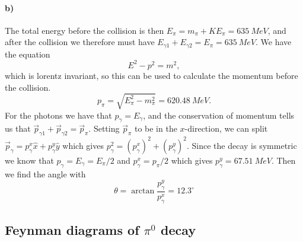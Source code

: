 \paragraph{b)} The total energy before the collision is then $E_\pi = m_\pi + KE_\pi = \SI{635}{MeV}$, and after the collision we therefore must have $E_{\gamma 1} + E_{\gamma 2} = E_\pi = \SI{635}{MeV}$. We have the equation
\begin{equation}
	E^2 - p^2 = m^2,
\end{equation}
which is lorentz invariant, so this can be used to calculate the momentum before the collision.
\begin{equation}
	p_\pi = \sqrt{E_\pi^2 - m_\pi^2} = \SI{620.48}{MeV}.
\end{equation}
For the photons we have that $p_\gamma = E_\gamma$, and the conservation of momentum tells us that $\vec{p}_{\gamma 1} + \vec{p}_{\gamma 2} = \vec{p}_\pi$. Setting $\vec{p}_\pi$ to be in the $x$-direction, we can split $\vec{p}_{\gamma} = p_{\gamma}^x \hat{x} + p_{\gamma}^y \hat{y}$ which gives $p_\gamma^2 = (p_\gamma^x)^2 + (p_\gamma^y)^2$. Since the decay is symmetric we know that $p_\gamma = E_\gamma = E_\pi /2 $ and $p_\gamma^x = p_\pi /2$ which gives $p_\gamma^y = \SI{67.51}{MeV}$. Then we find the angle with 
\begin{equation}
	\theta = \arctan{\frac{p_\gamma^y}{p_\gamma^x}} = 12.3^\circ
\end{equation}

\subsection{Feynman diagrams of \texorpdfstring{$\pi^0$}{pi} decay}

